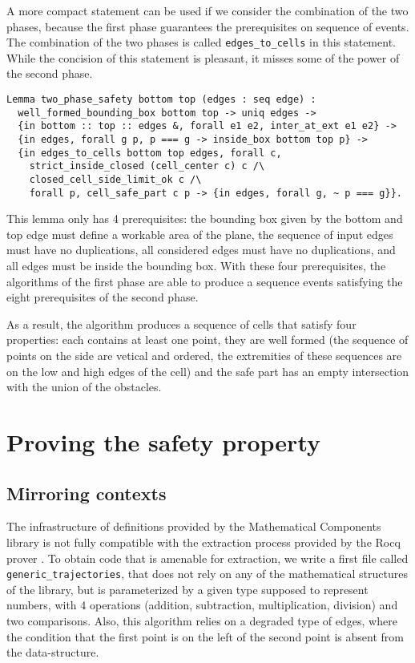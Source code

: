 \documentclass[a4paper, USenglish, cleveref, autoref, thm-restate]{lipics-v2021}
\begin{document}
A more compact statement can be used if we consider the combination of the
two phases, because the first phase guarantees the prerequisites on 
sequence of events.  The combination of the two phases is called
{\tt edges\_to\_cells} in this statement.
While the concision of this statement is pleasant, it
misses some of the power of the second phase.
\begin{verbatim}
Lemma two_phase_safety bottom top (edges : seq edge) :
  well_formed_bounding_box bottom top -> uniq edges ->
  {in bottom :: top :: edges &, forall e1 e2, inter_at_ext e1 e2} ->
  {in edges, forall g p, p === g -> inside_box bottom top p} ->
  {in edges_to_cells bottom top edges, forall c,
    strict_inside_closed (cell_center c) c /\
    closed_cell_side_limit_ok c /\
    forall p, cell_safe_part c p -> {in edges, forall g, ~ p === g}}.
\end{verbatim}
This lemma only has 4 prerequisites: the bounding box given by the
bottom and top edge must define a workable area of the plane, the sequence
of input edges must have no duplications, all considered edges must have
no duplications, and all edges must be inside the bounding box.  With these
four prerequisites, the algorithms of the first phase are able to produce
a sequence events satisfying the eight prerequisites of the second phase.

As a result, the algorithm produces a sequence of cells that satisfy four
properties: each contains at least one point, they are well formed (the 
sequence of points on the side are vetical and ordered, the extremities of
these sequences are on the low and high edges of the cell) and the safe
part has an empty intersection with the union of the obstacles.

\section{Proving the safety property}
\subsection{Mirroring contexts}
The infrastructure of definitions provided by the {\sc Mathematical
Components} library is not fully compatible with the extraction
process provided by the Rocq prover \cite{extraction}.
To obtain code that is amenable for extraction, we write a
first file called {\tt generic\_trajectories}, that does not rely on
any of the mathematical structures of the library, but is
parameterized by a given type supposed to represent numbers, with 4
operations (addition, subtraction, multiplication, division) and two
comparisons.  Also, this algorithm relies on a degraded type of edges,
where the condition that the first point is on the left of the second
point is absent from the data-structure.
\end{document}
